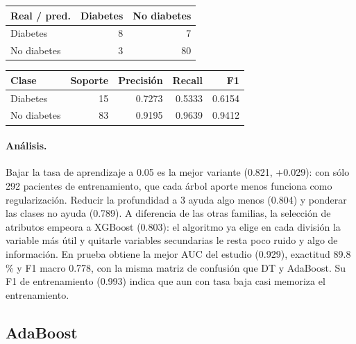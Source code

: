 \documentclass[11pt]{article}
\begin{document}
\begin{table}[H]\footnotesize\begin{minipage}[t]{0.44\linewidth}\centering{}\begin{tabular}{lrr}\toprule
Real / pred. & Diabetes & No diabetes \\ \midrule
Diabetes & 8 & 7 \\
No diabetes & 3 & 80 \\
\bottomrule\end{tabular}\end{minipage}\hfill\begin{minipage}[t]{0.52\linewidth}\centering{}\begin{tabular}{lrrrr}\toprule
Clase & Soporte & Precisión & Recall & F1 \\ \midrule
Diabetes & 15 & 0.7273 & 0.5333 & 0.6154 \\
No diabetes & 83 & 0.9195 & 0.9639 & 0.9412 \\
\bottomrule\end{tabular}\end{minipage}\end{table}

\paragraph{Análisis.} Bajar la tasa de aprendizaje a 0.05 es la mejor variante (0.821, +0.029): con sólo 292
pacientes de entrenamiento, que cada árbol aporte menos funciona como regularización.
Reducir la profundidad a 3 ayuda algo menos (0.804) y ponderar las clases no ayuda
(0.789). A diferencia de las otras familias, la selección de atributos empeora a XGBoost
(0.803): el algoritmo ya elige en cada división la variable más útil y quitarle
variables secundarias le resta poco ruido y algo de información. En prueba obtiene la
mejor AUC del estudio (0.929), exactitud 89.8\,\% y F1 macro 0.778, con la misma matriz
de confusión que DT y AdaBoost. Su F1 de entrenamiento (0.993) indica que aun con tasa
baja casi memoriza el entrenamiento.

\FloatBarrier

\subsection{AdaBoost}
\end{document}
